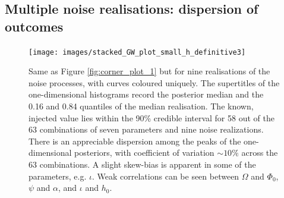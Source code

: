 \documentclass[fleqn,usenatbib,useAMS]{mnras}
\begin{document}



\subsection{Multiple noise realisations: dispersion of outcomes} \label{sec:multiple_noise}
\begin{figure}
	\texttt{[image: images/stacked\_GW\_plot\_small\_h\_definitive3]}
	\caption{Same as Figure \ref{fig:corner_plot_1} but for nine realisations of the noise processes, with curves coloured uniquely. The supertitles of the one-dimensional histograms record the posterior median and the 0.16 and 0.84 quantiles of the median realisation. The known, injected value lies within the 90\% credible interval for 58 out of the 63 combinations of seven parameters and nine noise realizations. There is an appreciable dispersion among the peaks of the one-dimensional posteriors, with coefficient of variation $\sim10 \%$ across the 63 combinations. A slight skew-bias is apparent in some of the parameters, e.g. $\iota$. Weak correlations can be seen between $\Omega$ and $\Phi_0$, $\psi$ and $\alpha$, and $\iota$ and $h_0$.} 
	\label{fig:corner_plot_2}
\end{figure}
\end{document}
